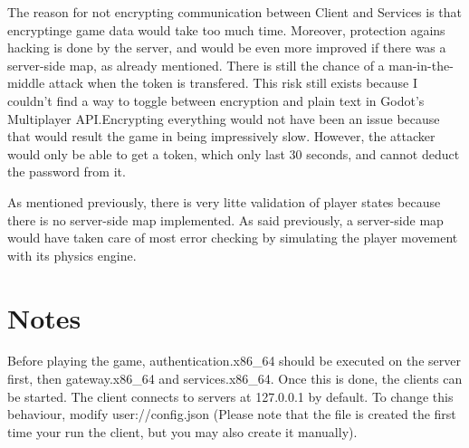 \documentclass{article}
\begin{document}
The reason for not encrypting communication between Client and Services is that encryptinge game data would take too much time. Moreover, protection agains hacking is done by the server, and would be even more improved if there was a server-side map, as already mentioned. There is still the chance of a man-in-the-middle attack when the token is transfered. This risk still exists because I couldn't find a way to toggle between encryption and plain text in Godot's Multiplayer API.Encrypting everything would not have been an issue because that would result the game in being impressively slow. However, the attacker would only be able to get a token, which only last 30 seconds, and cannot deduct the password from it. 

As mentioned previously, there is very litte validation of player states because there is no server-side map implemented. As said previously, a server-side map would have taken care of most error checking by simulating the player movement with its physics engine.

\section{Notes}
Before playing the game, authentication.x86\_64 should be executed on the server first, then gateway.x86\_64 and services.x86\_64. Once this is done, the clients can be started. The client connects to servers at 127.0.0.1 by default. To change this behaviour, modify user://config.json (Please note that the file is created the first time your run the client, but you may also create it manually).
\end{document}
